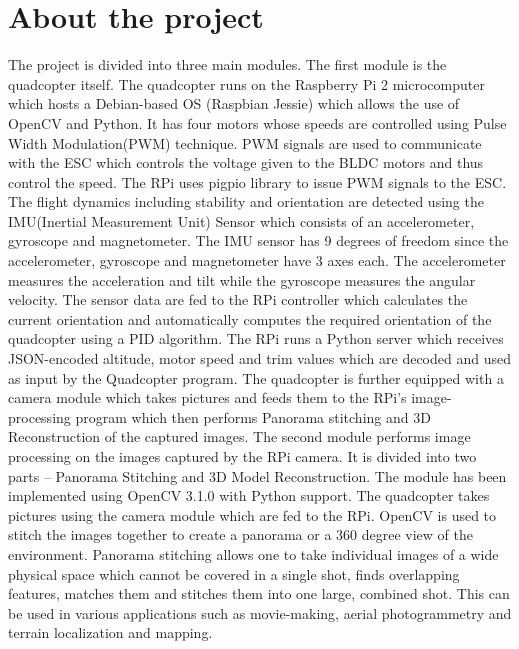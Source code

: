 \section{About the project} %
The project is divided into three main modules. The first module is the quadcopter itself.
The quadcopter runs on the Raspberry Pi 2\cite{wiki:rpi} microcomputer which hosts a Debian-based OS (Raspbian Jessie) which allows the use of OpenCV and Python. 
It has four motors whose speeds are controlled using Pulse Width Modulation(PWM) technique. PWM signals are used to communicate with the ESC which controls the voltage given to the BLDC motors and thus control the speed. The RPi uses pigpio library to issue PWM signals to the ESC. 
\newline
\newline
The flight dynamics including stability and orientation are detected using the IMU(Inertial Measurement Unit) Sensor which consists of an accelerometer, gyroscope and magnetometer. The IMU sensor has 9 degrees of freedom since the accelerometer, gyroscope and magnetometer have 3 axes each. The accelerometer measures the acceleration and tilt while the gyroscope measures the angular velocity. The sensor data are fed to the RPi controller which calculates the current orientation and automatically computes the required orientation of the quadcopter using a PID algorithm\cite{wiki:pid}. The RPi runs a Python server which receives JSON-encoded altitude, motor speed and trim values which are decoded and used as input by the Quadcopter program. The quadcopter is further equipped with a camera module which takes pictures and feeds them to the RPi's image-processing program which then performs Panorama stitching and 3D Reconstruction of the captured images.
\newline
\newline
The second module performs image processing on the images captured by the RPi camera. It is divided into two parts – Panorama Stitching\cite{wiki:pano} and 3D Model Reconstruction\cite{wiki:3d}. The module has been implemented using OpenCV 3.1.0 with Python support. The quadcopter takes pictures using the camera module which are fed to the RPi. OpenCV is used to stitch the images together to create a panorama or a 360 degree view of the environment. Panorama stitching allows one to take individual images of a wide physical space which cannot be covered in a single shot, finds overlapping features, matches them and stitches them into one large, combined shot. This can be used in various applications such as movie-making, aerial photogrammetry and terrain localization and mapping. 
